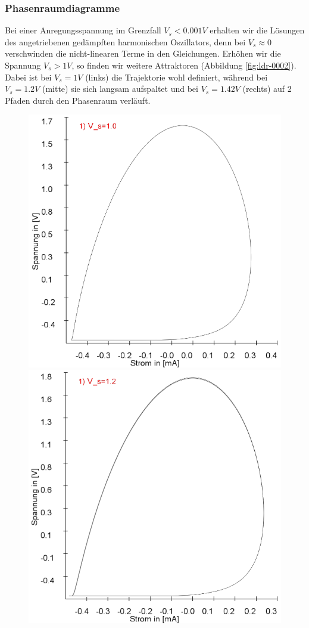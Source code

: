 \documentclass[12pt,a4paper]{article}
\begin{document}
\subsubsection{Phasenraumdiagramme}
Bei einer Anregungsspannung im Grenzfall $V_s < 0.001V$ erhalten wir die Lösungen des angetriebenen gedämpften harmonischen Oszillators, denn bei $V_s \approx 0$ verschwinden die nicht-linearen Terme in den Gleichungen. 
Erhöhen wir die Spannung $V_s>1V$, so finden wir weitere Attraktoren (Abbildung \ref{fig:ldr-0002}). Dabei ist bei $V_s=1V$ (links) die Trajektorie wohl definiert, während bei $V_s=1.2V$ (mitte) sie sich langsam aufspaltet und bei $V_s=1.42V$ (rechts) auf 2 Pfaden durch den Phasenraum verläuft.
\begin{figure}[!htbp]
\includegraphics[scale=0.28]{schwing-runge-nach300k-weitere20k-10-9-1V}
\includegraphics[scale=0.28]{schwing-runge-nach300k-weitere20k-10-9-1,2V}

\end{figure}
\end{document}
